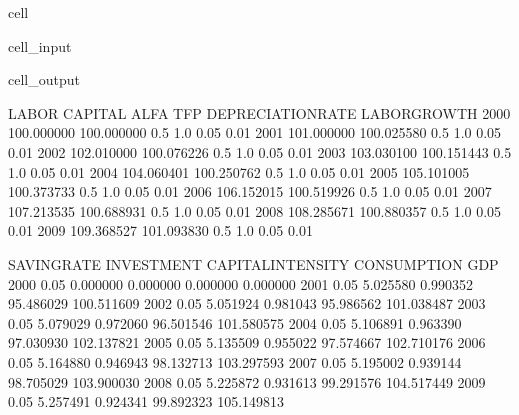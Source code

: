 \documentclass[letterpaper,10pt,english]{jupyterBook}
\begin{document}
\begin{sphinxuseclass}{cell}\begin{sphinxVerbatimInput}

\begin{sphinxuseclass}{cell_input}
\begin{sphinxVerbatim}[commandchars=\\\{\}]
   

\end{sphinxVerbatim}

\end{sphinxuseclass}\end{sphinxVerbatimInput}
\begin{sphinxVerbatimOutput}

\begin{sphinxuseclass}{cell_output}
\begin{sphinxVerbatim}[commandchars=\\\{\}]
           LABOR     CAPITAL  ALFA  TFP  DEPRECIATION\PYGZus{}RATE  LABOR\PYGZus{}GROWTH   
2000  100.000000  100.000000   0.5  1.0               0.05          0.01  \PYGZbs{}
2001  101.000000  100.025580   0.5  1.0               0.05          0.01   
2002  102.010000  100.076226   0.5  1.0               0.05          0.01   
2003  103.030100  100.151443   0.5  1.0               0.05          0.01   
2004  104.060401  100.250762   0.5  1.0               0.05          0.01   
2005  105.101005  100.373733   0.5  1.0               0.05          0.01   
2006  106.152015  100.519926   0.5  1.0               0.05          0.01   
2007  107.213535  100.688931   0.5  1.0               0.05          0.01   
2008  108.285671  100.880357   0.5  1.0               0.05          0.01   
2009  109.368527  101.093830   0.5  1.0               0.05          0.01   

      SAVING\PYGZus{}RATE  INVESTMENT  CAPITAL\PYGZus{}INTENSITY  CONSUMPTION         GDP  
2000         0.05    0.000000           0.000000     0.000000    0.000000  
2001         0.05    5.025580           0.990352    95.486029  100.511609  
2002         0.05    5.051924           0.981043    95.986562  101.038487  
2003         0.05    5.079029           0.972060    96.501546  101.580575  
2004         0.05    5.106891           0.963390    97.030930  102.137821  
2005         0.05    5.135509           0.955022    97.574667  102.710176  
2006         0.05    5.164880           0.946943    98.132713  103.297593  
2007         0.05    5.195002           0.939144    98.705029  103.900030  
2008         0.05    5.225872           0.931613    99.291576  104.517449  
2009         0.05    5.257491           0.924341    99.892323  105.149813  
\end{sphinxVerbatim}

\end{sphinxuseclass}\end{sphinxVerbatimOutput}

\end{sphinxuseclass}
\end{document}
